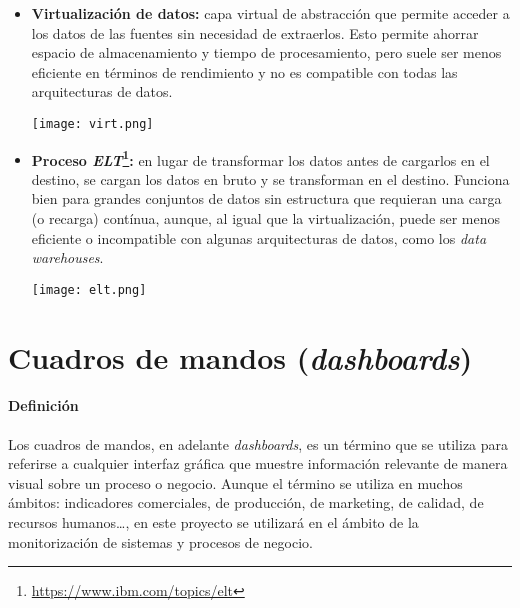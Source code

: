 \begin{itemize}
	\item \textbf{Virtualización de datos:} capa virtual de abstracción que
		permite acceder a los datos de las fuentes sin necesidad de extraerlos.
		Esto permite ahorrar espacio de almacenamiento y tiempo de
		procesamiento, pero suele ser menos eficiente en términos de rendimiento
		y no es compatible con todas las arquitecturas de datos.

		\begin{minipage}{\linewidth}
			\centering
			\texttt{[image: virt.png]}
		\end{minipage}
	\item \textbf{Proceso \textit{ELT}\footnote{\url{https://www.ibm.com/topics/elt}}:}
		en lugar de transformar los datos antes de cargarlos en el destino, se
		cargan los datos en bruto y se transforman en el destino. Funciona bien
		para grandes conjuntos de datos sin estructura que requieran una carga
		(o recarga) contínua, aunque, al igual que la virtualización, puede ser
		menos eficiente o incompatible con algunas arquitecturas de datos, como
		los \textit{data warehouses}.

		\begin{minipage}{\linewidth}
			\centering
			\texttt{[image: elt.png]}
		\end{minipage}
\end{itemize}


\newpage{}
\section{Cuadros de mandos (\textit{dashboards})}\label{sec:dashboards}
\paragraph{Definición}
Los cuadros de mandos, en adelante \textit{dashboards},
es un término que se utiliza para referirse a cualquier interfaz gráfica que
muestre información relevante de manera visual sobre un proceso o negocio.
Aunque el término se utiliza en muchos ámbitos: indicadores comerciales, de
producción, de marketing, de calidad, de recursos humanos\ldots, en este
proyecto se utilizará en el ámbito de la monitorización de sistemas y procesos
de negocio.

